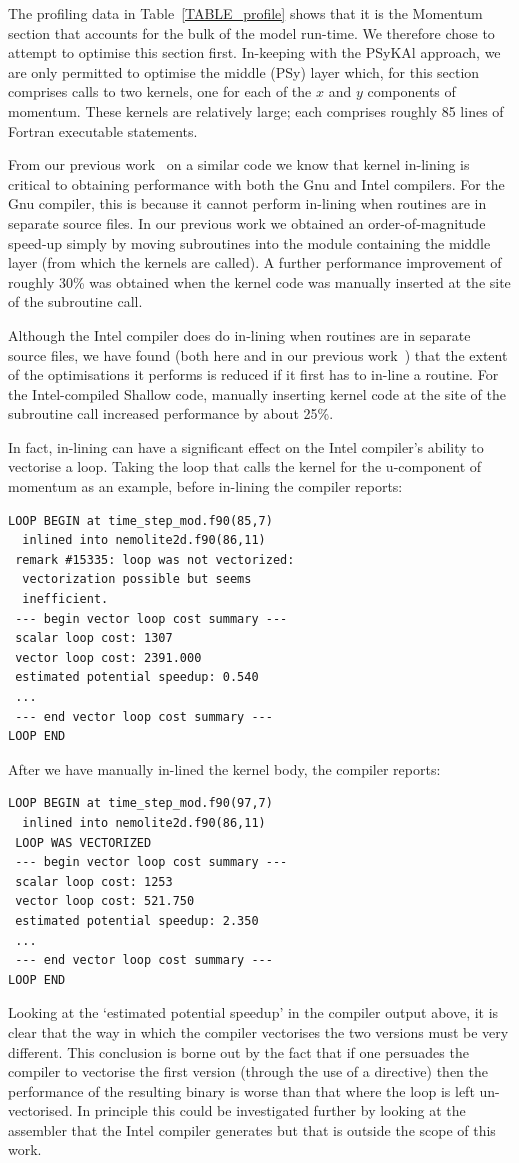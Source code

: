 \documentclass[gmd, manuscript]{copernicus}
\begin{document}
The profiling data in Table~\ref{TABLE_profile} shows that it is the
Momentum section that accounts for the bulk of the model run-time.  We
therefore chose to attempt to optimise this section first. In-keeping
with the {PS}y{KA}l approach, we are only permitted to optimise the middle
(PSy) layer which, for this section comprises calls to two kernels,
one for each of the $x$ and $y$ components of momentum. These kernels
are relatively large; each comprises roughly 85 lines of Fortran
executable statements.

From our previous work~\citep{shallow_psykal} on a similar code we know
that kernel in-lining is critical to obtaining performance with both
the Gnu and Intel compilers. For the Gnu compiler, this is because it
cannot perform in-lining when routines are in separate source
files. In our previous work we obtained an order-of-magnitude speed-up
simply by moving subroutines into the module containing the middle
layer (from which the kernels are called). A further performance
improvement of roughly 30\% was obtained when the kernel code was
manually inserted at the site of the subroutine call.

Although the Intel compiler does do in-lining when routines are in
separate source files, we have found (both here and in our previous
work~\citep{shallow_psykal}) that the extent of the optimisations it
performs is reduced if it first has to in-line a routine. For the
Intel-compiled Shallow code, manually inserting kernel code at the
site of the subroutine call increased performance by about 25\%.

In fact, in-lining can have a significant effect on the Intel
compiler's ability to vectorise a loop. Taking the loop that calls the
kernel for the u-component of momentum as an example, before in-lining
the compiler reports:
\begin{verbatim}
LOOP BEGIN at time_step_mod.f90(85,7) 
  inlined into nemolite2d.f90(86,11)
 remark #15335: loop was not vectorized: 
  vectorization possible but seems 
  inefficient. 
 --- begin vector loop cost summary ---
 scalar loop cost: 1307 
 vector loop cost: 2391.000 
 estimated potential speedup: 0.540 
 ...
 --- end vector loop cost summary ---
LOOP END
\end{verbatim}
After we have manually in-lined the kernel body, the compiler reports:
\begin{verbatim}
LOOP BEGIN at time_step_mod.f90(97,7) 
  inlined into nemolite2d.f90(86,11)
 LOOP WAS VECTORIZED
 --- begin vector loop cost summary ---
 scalar loop cost: 1253 
 vector loop cost: 521.750 
 estimated potential speedup: 2.350 
 ...
 --- end vector loop cost summary ---
LOOP END
\end{verbatim}
Looking at the `estimated potential speedup' in the compiler output
above, it is clear that the way in which the compiler vectorises the
two versions must be very different. This conclusion is borne out by
the fact that if one persuades the compiler to vectorise the first
version (through the use of a directive) then the performance of the
resulting binary is worse than that where the loop is left
un-vectorised. In principle this could be investigated further by
looking at the assembler that the Intel compiler generates but that is
outside the scope of this work.
\end{document}
